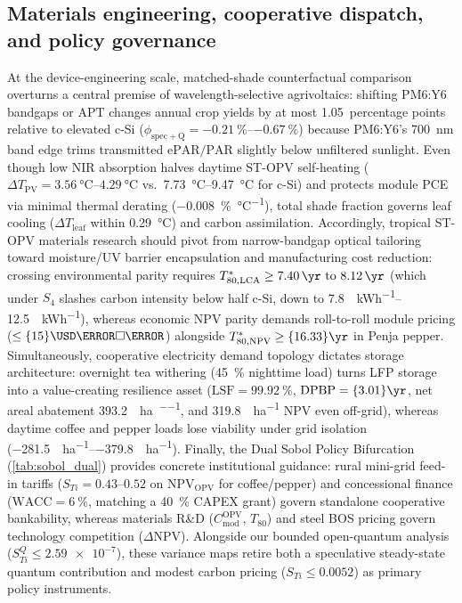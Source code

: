 \documentclass[preprint,12pt,a4paper]{elsarticle}
\begin{document}
\subsection{Materials engineering, cooperative dispatch, and policy governance}
\label{sec:disc_eng}

At the device-engineering scale, matched-shade counterfactual comparison overturns a central premise of wavelength-selective agrivoltaics: shifting PM6:Y6 bandgaps or $\mathrm{APT}$ changes annual crop yields by at most \num{1.05}~percentage points relative to elevated c-Si ($\phi_{\mathrm{spec+Q}} = \qtyrange{-0.21}{-0.67}{\percent}$) because PM6:Y6's \qty{700}{\nano\meter} band edge trims transmitted $\mathrm{ePAR}/\mathrm{PAR}$ slightly below unfiltered sunlight. Even though low NIR absorption halves daytime ST-OPV self-heating ($\Delta T_{\mathrm{PV}} = \qtyrange{3.56}{4.29}{\celsius}$ vs.\ \qtyrange{7.73}{9.47}{\celsius} for c-Si) and protects module PCE via minimal thermal derating (\qty{-0.008}{\percent\per\celsius}), total shade fraction governs leaf cooling ($\Delta T_{\mathrm{leaf}}$ within \qty{0.29}{\celsius}) and carbon assimilation. Accordingly, tropical ST-OPV materials research should pivot from narrow-bandgap optical tailoring toward moisture/UV barrier encapsulation and manufacturing cost reduction: crossing environmental parity requires $T_{80,\mathrm{LCA}}^* \ge \qtyrange{7.40}{8.12}{\yr}$ (which under $S_4$ slashes carbon intensity below half c-Si, down to \qtyrange{7.8}{12.5}{\gCOtwoe\per\kWh}), whereas economic NPV parity demands roll-to-roll module pricing ($\le \qty{15}{\USD\per\square\meter}$) alongside $T_{80,\mathrm{NPV}}^* \ge \qty{16.33}{\yr}$ in Penja pepper. Simultaneously, cooperative electricity demand topology dictates storage architecture: overnight tea withering (\qty{45}{\percent} nighttime load) turns LFP storage into a value-creating resilience asset ($\mathrm{LSF}=\qty{99.92}{\percent}$, $\mathrm{DPBP}=\qty{3.01}{\yr}$, net areal abatement \qty{393.2}{\tCOtwoe\per\hectare\per\yr}, and \qty{+319.8}{\kUSD\per\hectare} NPV even off-grid), whereas daytime coffee and pepper loads lose viability under grid isolation (\qtyrange{-281.5}{-379.8}{\kUSD\per\hectare}). Finally, the Dual Sobol Policy Bifurcation (\cref{tab:sobol_dual}) provides concrete institutional guidance: rural mini-grid feed-in tariffs ($S_{Ti}=\numrange{0.43}{0.52}$ on $\mathrm{NPV}_{\mathrm{OPV}}$ for coffee/pepper) and concessional finance ($\mathrm{WACC}=\qty{6}{\percent}$, matching a \qty{40}{\percent} CAPEX grant) govern standalone cooperative bankability, whereas materials R\&D ($C_{\mathrm{mod}}^{\mathrm{OPV}}$, $T_{80}$) and steel BOS pricing govern technology competition ($\Delta\mathrm{NPV}$). Alongside our bounded open-quantum analysis ($S_{Ti}^Q \le \num{2.59e-7}$), these variance maps retire both a speculative steady-state quantum contribution and modest carbon pricing ($S_{Ti} \le \num{0.0052}$) as primary policy instruments.
\end{document}
